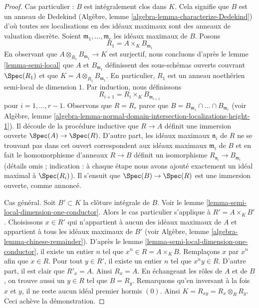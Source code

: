 \begin{proof}
Cas particulier : $B$ est intégralement clos dans $K$.
Cela signifie que $B$ est un anneau de Dedekind (Algèbre,
lemme \ref{algebra-lemma-characterize-Dedekind}) d'où toutes
ses localisations en des idéaux maximaux sont des anneaux
de valuation discrète. Soient $\mathfrak m_1, \ldots,
\mathfrak m_r$ les idéaux maximaux de $B$. Posons
$$
R_1 = A \times_K B_{\mathfrak m_1}
$$
En observant que $A \otimes_{R_1} B_{\mathfrak m_1} \to K$ est surjectif,
nous concluons d'après le lemme \ref{lemma-semi-local} que $A$ et
$B_{\mathfrak m_1}$ définissent des sous-schémas ouverts couvrant $\Spec(R_1)$
et que $K = A \otimes_{R_1} B_{\mathfrak m_1}$. En particulier, $R_1$ est un
anneau noethérien semi-local de dimension $1$. Par induction, nous définissons
$$
R_{i + 1} = R_i \times_K B_{\mathfrak m_{i + 1}}
$$
pour $i = 1, \ldots, r - 1$. Observons que $R = R_r$ parce
que $B = B_{\mathfrak m_1} \cap \ldots \cap B_{\mathfrak
m_r}$ (voir Algèbre, lemme
\ref{algebra-lemma-normal-domain-intersection-localizations-height-1}).
Il découle de la procédure inductive que $R \to A$ définit
une immersion ouverte $\Spec(A) \to \Spec(R)$. D'autre part,
les idéaux maximaux $\mathfrak n_i$ de $R$ ne se trouvant pas
dans cet ouvert correspondent aux idéaux maximaux $\mathfrak
m_i$ de $B$ et en fait le homomorphisme d'anneaux $R \to B$
définit un isomorphisme $R_{\mathfrak n_i} \to B_{\mathfrak
m_i}$ (détails omis ; indication : à chaque étape nous avons ajouté
exactement un idéal maximal à $\Spec(R_i)$). Il s'ensuit que
$\Spec(B) \to \Spec(R)$ est une immersion ouverte, comme annoncé.

\medskip\noindent
Cas général. Soit $B' \subset K$ la clôture intégrale de $B$.
Voir le lemme \ref{lemma-semi-local-dimension-one-conductor}.
Alors le cas particulier s'applique à $R' = A \times_K B'$.
Choisissons $x \in R'$ qui n'appartient à aucun des idéaux maximaux
de $A$ et appartient à tous les idéaux maximaux de $B'$
(voir Algèbre, lemme \ref{algebra-lemma-chinese-remainder}).
D'après le lemme \ref{lemma-semi-local-dimension-one-conductor},
il existe un entier $n$ tel que $x^n \in R = A \times_K B$.
Remplaçons $x$ par $x^n$ afin que $x \in R$. Pour tout $y \in R'$, il existe
un entier $n$ tel que $x^n y \in R$. D'autre part,
il est clair que $R'_x = A$. Ainsi $R_x = A$.
En échangeant les rôles de $A$ et de $B$, on trouve aussi un $y \in R$
tel que $B = R_y$. Remarquons qu'en inversant à la fois $x$ et $y$, il
ne reste aucun idéal premier hormis $(0)$. Ainsi $K = R_{xy} = R_x \otimes_R R_y$.
Ceci achève la démonstration.
\end{proof}

